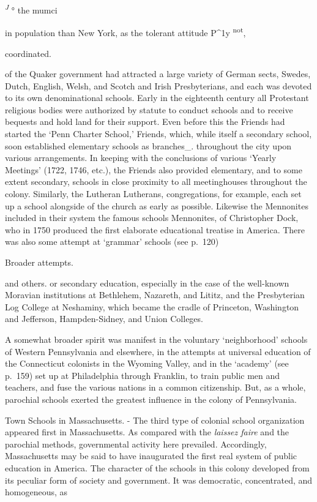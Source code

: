 \documentclass[
]{book}
\begin{document}
\emph{\textsuperscript{J}} ° the mumci

in population than New York, as the tolerant attitude P\^{}1y \textsuperscript{not},

coordinated.

of the Quaker government had attracted a large variety of German sects, Swedes, Dutch, English, Welsh, and Scotch and Irish Presbyterians, and each was devoted to its own denominational schools. Early in the eighteenth century all Protestant religious bodies were authorized by statute to conduct schools and to receive bequests and hold land for their support. Even before this the Friends had started the `Penn Charter School,' Friends, which, while itself a secondary school, soon established elementary schools as branches\_. throughout the city upon various arrangements. In keeping with the conclusions of various `Yearly Meetings' (1722, 1746, etc.), the Friends also provided elementary, and to some extent secondary, schools in close proximity to all meetinghouses throughout the colony. Similarly, the Lutheran Lutherans, congregations, for example, each set up a school alongside of the church as early as possible. Likewise the Mennonites included in their system the famous schools Mennonites, of Christopher Dock, who in 1750 produced the first elaborate educational treatise in America. There was also some attempt at `grammar' schools (see p.~120)

Broader attempts.

and others. or secondary education, especially in the case of the well-known Moravian institutions at Bethlehem, Nazareth, and Lititz, and the Presbyterian Log College at Neshaminy, which became the cradle of Princeton, Washington and Jefferson, Hampden-Sidney, and Union Colleges.

A somewhat broader spirit was manifest in the voluntary `neighborhood' schools of Western Pennsylvania and elsewhere, in the attempts at universal education of the Connecticut colonists in the Wyoming Valley, and in the `academy' (see p.~159) set up at Philadelphia through Franklin, to train public men and teachers, and fuse the various nations in a common citizenship. But, as a whole, parochial schools exerted the greatest influence in the colony of Pennsylvania.

Town Schools in Massachusetts. - The third type of colonial school organization appeared first in Massachusetts. As compared with the \emph{laissez faire} and the parochial methods, governmental activity here prevailed. Accordingly, Massachusetts may be said to have inaugurated the first real system of public education in America. The character of the schools in this colony developed from its peculiar form of society and government. It was democratic, concentrated, and homogeneous, as
\end{document}
